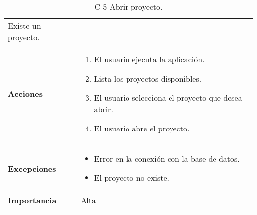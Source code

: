 \begin{longtable}[H]{@{}ll@{}}
\begin{minipage}[t]{0.71\columnwidth}
Existe un proyecto.
\strut
\end{minipage}\tabularnewline
\begin{minipage}[t]{0.23\columnwidth}\raggedright\strut
\textbf{Acciones}\strut
\end{minipage} & \begin{minipage}[t]{0.71\columnwidth}\raggedright\strut
\begin{enumerate}
\def\labelenumi{\arabic{enumi}.}
\item
El usuario ejecuta la aplicación.
\item
Lista los proyectos disponibles.
\item
El usuario selecciona el proyecto que desea abrir.
\item
El usuario abre el proyecto.
\end{enumerate}\strut
\end{minipage}\tabularnewline
\begin{minipage}[t]{0.23\columnwidth}\raggedright\strut
\textbf{Excepciones}\strut
\end{minipage} & \begin{minipage}[t]{0.71\columnwidth}\raggedright\strut
\begin{itemize}
\item
Error en la conexión con la base de datos.
\item
El proyecto no existe.
\end{itemize}\strut
\end{minipage}\tabularnewline
\begin{minipage}[t]{0.23\columnwidth}\raggedright\strut
\textbf{Importancia}\strut
\end{minipage} & \begin{minipage}[t]{0.71\columnwidth}\raggedright\strut
Alta\strut
\end{minipage}\tabularnewline
\bottomrule
\caption{C-5 Abrir proyecto.}
\end{longtable}


